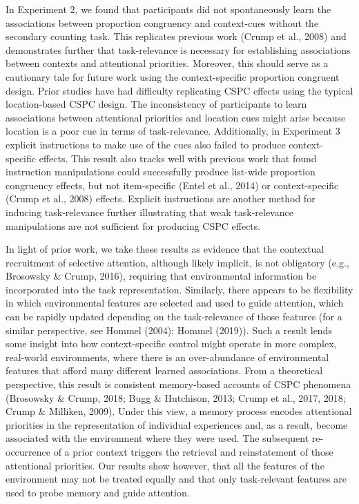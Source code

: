 \documentclass[english,,man,floatsintext]{apa6}
\begin{document}
In Experiment 2, we found that participants did not spontaneously learn the associations between proportion congruency and context-cues without the secondary counting task. This replicates previous work (Crump et al., 2008) and demonstrates further that task-relevance is necessary for establishing associations between contexts and attentional priorities. Moreover, this should serve as a cautionary tale for future work using the context-specific proportion congruent design. Prior studies have had difficulty replicating CSPC effects using the typical location-based CSPC design. The inconsistency of participants to learn associations between attentional priorities and location cues might arise because location is a poor cue in terms of task-relevance. Additionally, in Experiment 3 explicit instructions to make use of the cues also failed to produce context-specific effects. This result also tracks well with previous work that found instruction manipulations could successfully produce list-wide proportion congruency effects, but not item-specific (Entel et al., 2014) or context-specific (Crump et al., 2008) effects. Explicit instructions are another method for inducing task-relevance further illustrating that weak task-relevance manipulations are not sufficient for producing CSPC effects.

In light of prior work, we take these results as evidence that the contextual recruitment of selective attention, although likely implicit, is not obligatory (e.g., Brosowsky \& Crump, 2016), requiring that environmental information be incorporated into the task representation. Similarly, there appears to be flexibility in which environmental features are selected and used to guide attention, which can be rapidly updated depending on the task-relevance of those features (for a similar perspective, see Hommel (2004); Hommel (2019)). Such a result lends some insight into how context-specific control might operate in more complex, real-world environments, where there is an over-abundance of environmental features that afford many different learned associations. From a theoretical perspective, this result is consistent memory-based accounts of CSPC phenomena (Brosowsky \& Crump, 2018; Bugg \& Hutchison, 2013; Crump et al., 2017, 2018; Crump \& Milliken, 2009). Under this view, a memory process encodes attentional priorities in the representation of individual experiences and, as a result, become associated with the environment where they were used. The subsequent re-occurrence of a prior context triggers the retrieval and reinstatement of those attentional priorities. Our results show however, that all the features of the environment may not be treated equally and that only task-relevant features are used to probe memory and guide attention.
\end{document}
